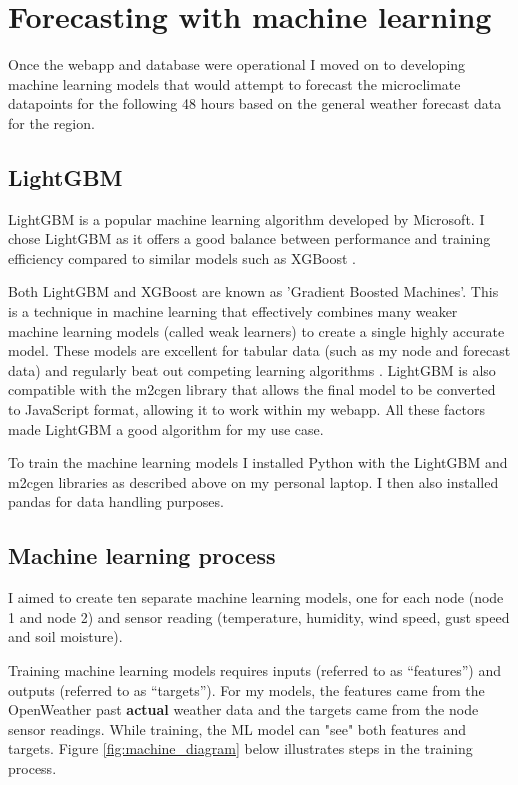 \section{Forecasting with machine learning}\label{sec:machine-learning}

Once the webapp and database were operational I moved on to developing machine
learning models that would attempt to forecast the microclimate datapoints for
the following 48 hours based on the general weather forecast data for the
region.
\subsection{LightGBM}

LightGBM is a popular machine learning algorithm developed by Microsoft. I chose
LightGBM as it offers a good balance between performance and training efficiency
compared to similar models such as XGBoost \cite{saha2025}.

Both LightGBM and XGBoost are known as 'Gradient Boosted Machines'. This is a
technique in machine learning that effectively combines many weaker machine
learning models (called weak learners) to create a single highly accurate model.
These models are excellent for tabular data (such as my node and forecast data)
and regularly beat out competing learning algorithms \cite{tuychiev2023}.
LightGBM is also compatible with the m2cgen library that allows the final model
to be converted to JavaScript format, allowing it to work within my webapp. All
these factors made LightGBM a good algorithm for my use case.

To train the machine learning models I installed Python with the LightGBM and
m2cgen libraries as described above on my personal laptop. I then also installed
pandas for data handling purposes.

\subsection{Machine learning process}

I aimed to create ten separate machine learning models, one for each node (node
1 and node 2) and sensor reading (temperature, humidity, wind speed, gust speed
and soil moisture).

Training machine learning models requires inputs (referred to as “features”) and
outputs (referred to as “targets”).  For my models, the features came from the
OpenWeather past \textbf{actual} weather data and the targets came from the node
sensor readings. While training, the ML model can "see" both features and
targets. Figure \ref{fig:machine_diagram} below illustrates steps in the
training process.

